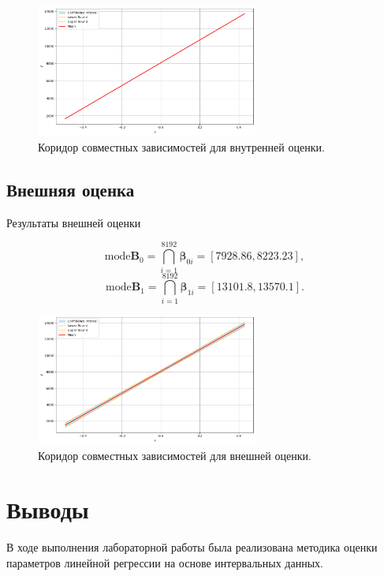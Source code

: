\documentclass{article}
\begin{document}
    \begin{figure}[htbp!]
        \begin{center}
            \includegraphics[width = 0.65\textwidth]{mode_in}
            \caption{Коридор совместных зависимостей для внутренней оценки.}
    \label{figure:int_est}
        \end{center}
    \end{figure}

  \subsection{Внешняя оценка}

  Результаты внешней оценки

  \[
    \text{mode} \mathbf{B}_0 = \bigcap_{i=1}^{8192} \mathbf{\beta}_{0i}
      = [7928.86, 8223.23],
  \]
  \[
    \text{mode} \mathbf{B}_1 = \bigcap_{i=1}^{8192} \mathbf{\beta}_{1i}
      = [13101.8, 13570.1].
  \]

    \begin{figure}[htbp!]
        \begin{center}
            \includegraphics[width = 0.65\textwidth]{mode_ex}
            \caption{Коридор совместных зависимостей для внешней оценки.}
    \label{figure:ext_est}
        \end{center}
    \end{figure}

    \clearpage
    \section{Выводы}
    В ходе выполнения лабораторной работы была реализована методика оценки  
    параметров линейной регрессии на основе интервальных данных. 
\end{document}
